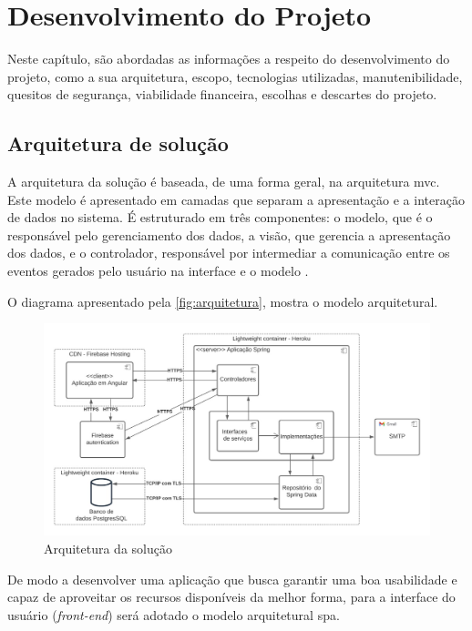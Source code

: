 \documentclass[
    12pt,               %
    openright,          %
    oneside,
    a4paper,            %
    english,            %
    brazil              %
    ]{ifsp-spo-inf-ctds} %
\begin{document}



\chapter{Desenvolvimento do Projeto}
Neste capítulo, são abordadas as informações a respeito do desenvolvimento do projeto, como a sua arquitetura, escopo, tecnologias utilizadas, manutenibilidade, quesitos de segurança, viabilidade financeira, escolhas e descartes do projeto.

\section{Arquitetura de solução}

A arquitetura da solução é baseada, de uma forma geral, na arquitetura \ac{mvc}. Este modelo é apresentado em camadas que separam a apresentação e a interação de dados no sistema. É estruturado em três componentes: o modelo, que é o responsável pelo gerenciamento dos dados, a visão, que gerencia a apresentação dos dados, e o controlador, responsável por intermediar a comunicação entre os eventos gerados pelo usuário na interface e o modelo \cite{engenharia-de-software:2018}.

O diagrama apresentado pela \autoref{fig:arquitetura}, mostra o modelo arquitetural.

\begin{figure}[htb]
    \centering
	\includegraphics[width=16cm]{imagens/Arquitetura.jpg}
	\caption{\label{fig:arquitetura} Arquitetura da solução}
\end{figure}
 
 
De modo a desenvolver uma aplicação que busca garantir uma boa usabilidade e capaz de aproveitar os recursos disponíveis da melhor forma, para a interface do usuário (\textit{\gls{front-end}}) será adotado o modelo arquitetural \ac{spa}. 
\end{document}
